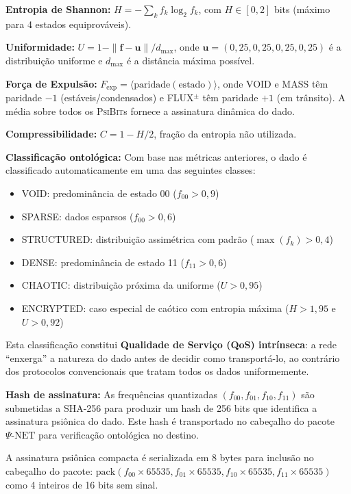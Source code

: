 \documentclass[12pt,a4paper]{article}
\newcommand{\Fexp}{F_{\text{exp}}}
\newcommand{\PsiBit}{\textsc{PsiBit}}
\newcommand{\PsiNet}{\Psi\text{-NET}}
\begin{document}
\textbf{Entropia de Shannon:}
$H = -\sum_k f_k \log_2 f_k$, com $H \in [0, 2]$ bits (máximo
para 4 estados equiprováveis).

\textbf{Uniformidade:}
$U = 1 - \|\mathbf{f} - \mathbf{u}\| / d_{\max}$, onde
$\mathbf{u} = (0{,}25, 0{,}25, 0{,}25, 0{,}25)$ é a
distribuição uniforme e $d_{\max}$ é a distância máxima
possível.

\textbf{Força de Expulsão:}
$\Fexp = \langle \text{paridade}(\text{estado}) \rangle$,
onde VOID e MASS têm paridade $-1$ (estáveis/condensados) e
FLUX$^\pm$ têm paridade $+1$ (em trânsito). A média sobre
todos os \PsiBit{}s fornece a assinatura dinâmica do dado.

\textbf{Compressibilidade:}
$C = 1 - H/2$, fração da entropia não utilizada.

\textbf{Classificação ontológica:} Com base nas métricas
anteriores, o dado é classificado automaticamente em uma das
seguintes classes:

\begin{itemize}[nosep]
\item VOID: predominância de estado 00 ($f_{00} > 0{,}9$)
\item SPARSE: dados esparsos ($f_{00} > 0{,}6$)
\item STRUCTURED: distribuição assimétrica com padrão
  ($\max(f_k) > 0{,}4$)
\item DENSE: predominância de estado 11 ($f_{11} > 0{,}6$)
\item CHAOTIC: distribuição próxima da uniforme
  ($U > 0{,}95$)
\item ENCRYPTED: caso especial de caótico com entropia
  máxima ($H > 1{,}95$ e $U > 0{,}92$)
\end{itemize}

Esta classificação constitui \textbf{Qualidade de Serviço
(QoS) intrínseca}: a rede ``enxerga'' a natureza do dado
antes de decidir como transportá-lo, ao contrário dos
protocolos convencionais que tratam todos os dados
uniformemente.

\textbf{Hash de assinatura:} As frequências quantizadas
$(f_{00}, f_{01}, f_{10}, f_{11})$ são submetidas a SHA-256
para produzir um hash de 256 bits que identifica a assinatura
psiônica do dado. Este hash é transportado no cabeçalho do
pacote $\PsiNet$ para verificação ontológica no destino.

A assinatura psiônica compacta é serializada em 8 bytes para
inclusão no cabeçalho do pacote:
$\text{pack}(f_{00} \times 65535, f_{01} \times 65535,
f_{10} \times 65535, f_{11} \times 65535)$ como 4 inteiros
de 16 bits sem sinal.
\end{document}
